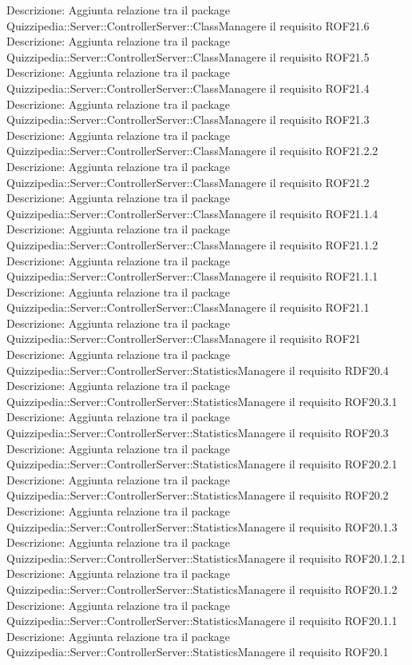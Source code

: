 Descrizione: Aggiunta relazione tra il package Quizzipedia::Server::ControllerServer::ClassManagere il requisito ROF21.6 
Descrizione: Aggiunta relazione tra il package Quizzipedia::Server::ControllerServer::ClassManagere il requisito ROF21.5 
Descrizione: Aggiunta relazione tra il package Quizzipedia::Server::ControllerServer::ClassManagere il requisito ROF21.4 
Descrizione: Aggiunta relazione tra il package Quizzipedia::Server::ControllerServer::ClassManagere il requisito ROF21.3 
Descrizione: Aggiunta relazione tra il package Quizzipedia::Server::ControllerServer::ClassManagere il requisito ROF21.2.2 
Descrizione: Aggiunta relazione tra il package Quizzipedia::Server::ControllerServer::ClassManagere il requisito ROF21.2 
Descrizione: Aggiunta relazione tra il package Quizzipedia::Server::ControllerServer::ClassManagere il requisito ROF21.1.4 
Descrizione: Aggiunta relazione tra il package Quizzipedia::Server::ControllerServer::ClassManagere il requisito ROF21.1.2 
Descrizione: Aggiunta relazione tra il package Quizzipedia::Server::ControllerServer::ClassManagere il requisito ROF21.1.1 
Descrizione: Aggiunta relazione tra il package Quizzipedia::Server::ControllerServer::ClassManagere il requisito ROF21.1 
Descrizione: Aggiunta relazione tra il package Quizzipedia::Server::ControllerServer::ClassManagere il requisito ROF21 
Descrizione: Aggiunta relazione tra il package Quizzipedia::Server::ControllerServer::StatisticsManagere il requisito RDF20.4 
Descrizione: Aggiunta relazione tra il package Quizzipedia::Server::ControllerServer::StatisticsManagere il requisito ROF20.3.1 
Descrizione: Aggiunta relazione tra il package Quizzipedia::Server::ControllerServer::StatisticsManagere il requisito ROF20.3 
Descrizione: Aggiunta relazione tra il package Quizzipedia::Server::ControllerServer::StatisticsManagere il requisito ROF20.2.1 
Descrizione: Aggiunta relazione tra il package Quizzipedia::Server::ControllerServer::StatisticsManagere il requisito ROF20.2 
Descrizione: Aggiunta relazione tra il package Quizzipedia::Server::ControllerServer::StatisticsManagere il requisito ROF20.1.3 
Descrizione: Aggiunta relazione tra il package Quizzipedia::Server::ControllerServer::StatisticsManagere il requisito ROF20.1.2.1 
Descrizione: Aggiunta relazione tra il package Quizzipedia::Server::ControllerServer::StatisticsManagere il requisito ROF20.1.2 
Descrizione: Aggiunta relazione tra il package Quizzipedia::Server::ControllerServer::StatisticsManagere il requisito ROF20.1.1 
Descrizione: Aggiunta relazione tra il package Quizzipedia::Server::ControllerServer::StatisticsManagere il requisito ROF20.1 
